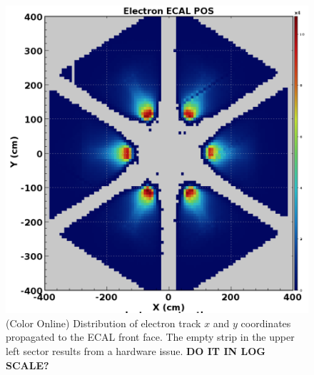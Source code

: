 \documentclass[final,3p,twocolumn]{elsarticle}
\begin{document}
\begin{figure}[t!]
\centerline{\includegraphics[width=1.0\columnwidth]{ElectronsOnPCAL.png}}
\caption{(Color Online) Distribution of electron track $x$ and $y$ coordinates propagated to the ECAL front face. The empty strip 
in the upper left sector results from a hardware issue. {\bf DO IT IN LOG SCALE?}} 
\label{electrons-xy}
\end{figure}
\end{document}
